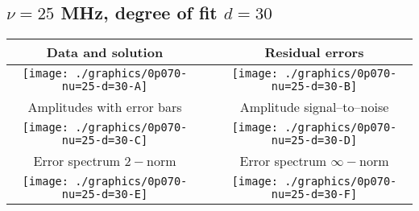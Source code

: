 

% 

\clearpage{}
\break{}

\subsection{$\nu = 25$ MHz, degree of fit $d = 30$}

\begin{table}[h]
    \begin{center}
        \begin{tabular}{ccc}
            Data and solution & \quad & Residual errors \\\hline
            \texttt{[image: ./graphics/0p070-nu=25-d=30-A]} &&
            \texttt{[image: ./graphics/0p070-nu=25-d=30-B]} \\[15pt]
            Amplitudes with error bars && Amplitude signal--to--noise \\\hline
            \texttt{[image: ./graphics/0p070-nu=25-d=30-C]} &&
            \texttt{[image: ./graphics/0p070-nu=25-d=30-D]} \\[15pt]
            Error spectrum $2-$norm && Error spectrum $\infty-$norm \\\hline
            \texttt{[image: ./graphics/0p070-nu=25-d=30-E]} &&
            \texttt{[image: ./graphics/0p070-nu=25-d=30-F]} \\[15pt]
        \end{tabular}
    \end{center}
\label{fig:elev=70, nu=25}
\end{table}



\endinput
